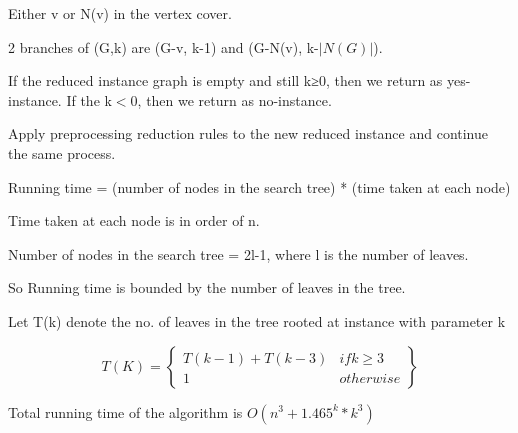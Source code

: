 Either v or N(v) in the vertex cover. 

2 branches of (G,k) are (G-v, k-1) and (G-N(v), k-$|N(G)|$). 

If the reduced instance graph is empty and still k≥0, then we return as yes-instance. If the
k$<$0, then we return as no-instance.

Apply preprocessing reduction rules to the new reduced instance and continue the same process. 

Running time = (number of nodes in the search tree) * (time taken at each node) 

Time taken at each node is in order of n. 

Number of nodes in the search tree = 2l-1, where l is the number of leaves. 

So Running time is bounded by the number of leaves in the tree. 

Let T(k) denote the no. of leaves in the tree rooted at instance with parameter k 

\[
    T(K)=
    \left\{
    \begin{array}{lr}
       T(k-1) + T(k-3)& if k \geq 3 \\
      1& otherwise 
    \end{array}
    \right\} 
\]

Total running time of the algorithm is $O(n^3 + 1.465^k*k^3)$
